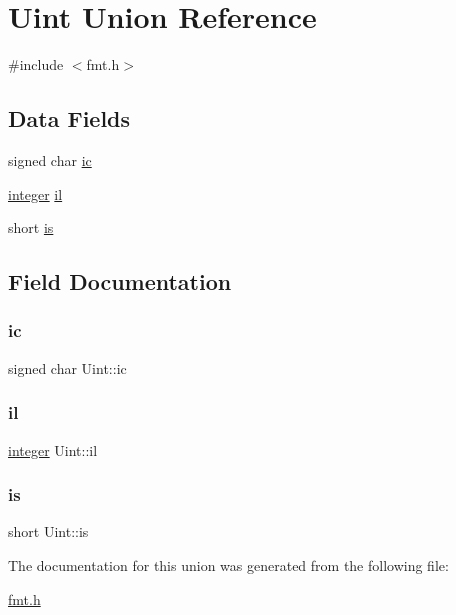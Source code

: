 \hypertarget{union_uint}{}\section{Uint Union Reference}
\label{union_uint}


{\ttfamily \#include $<$fmt.\+h$>$}

\subsection*{Data Fields}
\begin{DoxyCompactItemize}
\item 
signed char \hyperlink{union_uint_aed164543cf7f03e0c0b7de12f747a9cc}{ic}
\item 
\hyperlink{dependencies_2third-party_2clapack_23_82_81_2_f2_c_l_i_b_s_2libf2c_2f2c_8h_a99e088ad9e1bf72a6c0e148a6c2b7012}{integer} \hyperlink{union_uint_a43b083a2c6d73520380a331f310fbf1b}{il}
\item 
short \hyperlink{union_uint_a079e2c8cbc46def76d80fa8549d05716}{is}
\end{DoxyCompactItemize}


\subsection{Field Documentation}
\mbox{\label{union_uint_aed164543cf7f03e0c0b7de12f747a9cc}} 
\subsubsection{\texorpdfstring{ic}{ic}}
{\footnotesize\ttfamily signed char Uint\+::ic}

\mbox{\label{union_uint_a43b083a2c6d73520380a331f310fbf1b}} 
\subsubsection{\texorpdfstring{il}{il}}
{\footnotesize\ttfamily \hyperlink{dependencies_2third-party_2clapack_23_82_81_2_f2_c_l_i_b_s_2libf2c_2f2c_8h_a99e088ad9e1bf72a6c0e148a6c2b7012}{integer} Uint\+::il}

\mbox{\label{union_uint_a079e2c8cbc46def76d80fa8549d05716}} 
\subsubsection{\texorpdfstring{is}{is}}
{\footnotesize\ttfamily short Uint\+::is}



The documentation for this union was generated from the following file\+:\begin{DoxyCompactItemize}
\item 
\hyperlink{fmt_8h}{fmt.\+h}\end{DoxyCompactItemize}
